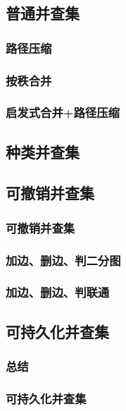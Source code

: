 \documentclass[10pt,a4paper]{article}
\begin{document}
\subsection{普通并查集}
\subsubsection{路径压缩}

\subsubsection{按秩合并}

\subsubsection{启发式合并+路径压缩}

\subsection{种类并查集}
\subsection{可撤销并查集}
\subsubsection{可撤销并查集}

\subsubsection{加边、删边、判二分图}

\subsubsection{加边、删边、判联通}

\subsection{可持久化并查集}
\subsubsection{总结}

\subsubsection{可持久化并查集}

\end{document}
